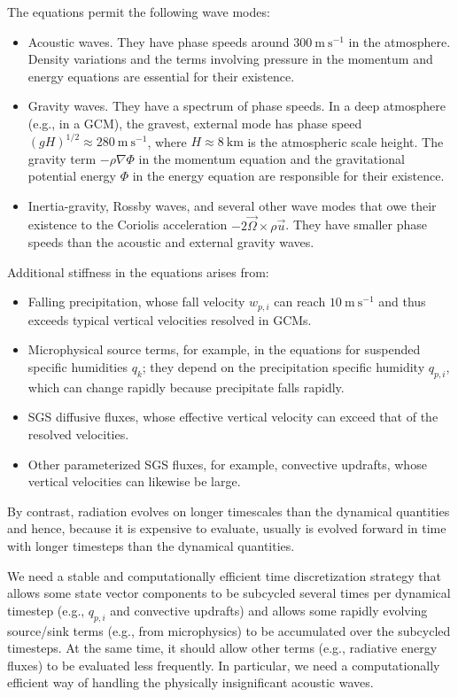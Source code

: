 \documentclass{report}
\begin{document}
The equations permit the following wave modes:
\begin{itemize}
    \item Acoustic waves. They have phase speeds around $300~\mathrm{m~s^{-1}}$ in the atmosphere. Density variations and the terms involving pressure in the momentum and energy equations are essential for their existence.
    \item Gravity waves. They have a spectrum of phase speeds. In a deep atmosphere (e.g., in a GCM), the gravest, external mode has phase speed $(gH)^{1/2} \approx 280~\mathrm{m~s^{-1}}$, where $H\approx 8~\mathrm{km}$ is the atmospheric scale height. The gravity term $-\rho \nabla \Phi$ in the momentum equation and the gravitational potential energy $\Phi$ in the energy equation are responsible for their existence.
    \item Inertia-gravity, Rossby waves, and several other wave modes that owe their existence to the Coriolis acceleration $-2\vec{\Omega} \times \rho \vec{u}$. They have smaller phase speeds than the acoustic and external gravity waves.
\end{itemize}
Additional stiffness in the equations arises from:
\begin{itemize}
    \item Falling precipitation, whose fall velocity $w_{p,i}$ can reach $10~\mathrm{m~s^{-1}}$ and thus exceeds typical vertical velocities resolved in GCMs.
    \item Microphysical source terms, for example, in the equations for suspended specific humidities $q_k$; they depend on the precipitation specific humidity $q_{p,i}$, which can change rapidly because precipitate falls rapidly. 
    \item SGS diffusive fluxes, whose effective vertical velocity can exceed that of the resolved velocities.
    \item Other parameterized SGS fluxes, for example, convective updrafts, whose vertical velocities can likewise be large.
\end{itemize}
By contrast, radiation evolves on longer timescales than the dynamical quantities and hence, because it is expensive to evaluate, usually is evolved forward in time with longer timesteps than the dynamical quantities. 

We need a stable and computationally efficient time discretization strategy that allows some state vector components to be subcycled several times per dynamical timestep (e.g., $q_{p,i}$ and convective updrafts) and allows some rapidly evolving source/sink terms (e.g., from microphysics) to be accumulated over the subcycled timesteps. At the same time, it should allow other terms (e.g., radiative energy fluxes) to be evaluated less frequently. In particular, we need a computationally efficient way of handling the physically insignificant acoustic waves.
\end{document}
